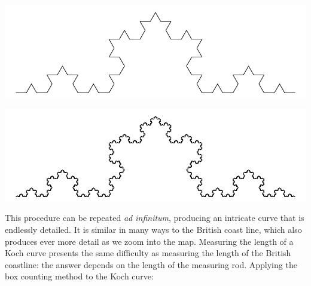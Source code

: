 \noindent\begin{minipage}[t][][b]{.5\textwidth}
  \includegraphics[width=\textwidth]{../figures/koch3.pdf}\\
\end{minipage}
\begin{minipage}[t][][t]{.5\textwidth}
  \label{fig:koch3}
\end{minipage}

\noindent\begin{minipage}[t][][b]{.5\textwidth}
  \includegraphics[width=\textwidth]{../figures/koch6.pdf}\\
\end{minipage}
\begin{minipage}[t][][t]{.5\textwidth}
  \label{fig:koch6}
\end{minipage}

This procedure can be repeated \emph{ad infinitum}, producing an
intricate curve that is endlessly detailed. It is similar in many ways
to the British coast line, which also produces ever more detail as we
zoom into the map. Measuring the length of a Koch curve presents the
same difficulty as measuring the length of the British coastline: the
answer depends on the length of the measuring rod. Applying the box
counting method to the Koch curve:\\


